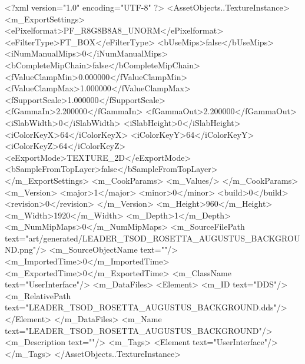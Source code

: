 <?xml version="1.0" encoding="UTF-8" ?>
<AssetObjects..TextureInstance>
	<m_ExportSettings>
		<ePixelformat>PF_R8G8B8A8_UNORM</ePixelformat>
		<eFilterType>FT_BOX</eFilterType>
		<bUseMips>false</bUseMips>
		<iNumManualMips>0</iNumManualMips>
		<bCompleteMipChain>false</bCompleteMipChain>
		<fValueClampMin>0.000000</fValueClampMin>
		<fValueClampMax>1.000000</fValueClampMax>
		<fSupportScale>1.000000</fSupportScale>
		<fGammaIn>2.200000</fGammaIn>
		<fGammaOut>2.200000</fGammaOut>
		<iSlabWidth>0</iSlabWidth>
		<iSlabHeight>0</iSlabHeight>
		<iColorKeyX>64</iColorKeyX>
		<iColorKeyY>64</iColorKeyY>
		<iColorKeyZ>64</iColorKeyZ>
		<eExportMode>TEXTURE_2D</eExportMode>
		<bSampleFromTopLayer>false</bSampleFromTopLayer>
	</m_ExportSettings>
	<m_CookParams>
		<m_Values/>
	</m_CookParams>
	<m_Version>
		<major>1</major>
		<minor>0</minor>
		<build>0</build>
		<revision>0</revision>
	</m_Version>
	<m_Height>960</m_Height>
	<m_Width>1920</m_Width>
	<m_Depth>1</m_Depth>
	<m_NumMipMaps>0</m_NumMipMaps>
	<m_SourceFilePath text="art/generated/LEADER_TSOD_ROSETTA_AUGUSTUS_BACKGROUND.png"/>
	<m_SourceObjectName text=""/>
	<m_ImportedTime>0</m_ImportedTime>
	<m_ExportedTime>0</m_ExportedTime>
	<m_ClassName text="UserInterface"/>
	<m_DataFiles>
		<Element>
			<m_ID text="DDS"/>
			<m_RelativePath text="LEADER_TSOD_ROSETTA_AUGUSTUS_BACKGROUND.dds"/>
		</Element>
	</m_DataFiles>
	<m_Name text="LEADER_TSOD_ROSETTA_AUGUSTUS_BACKGROUND"/>
	<m_Description text=""/>
	<m_Tags>
		<Element text="UserInterface"/>
	</m_Tags>
</AssetObjects..TextureInstance>
